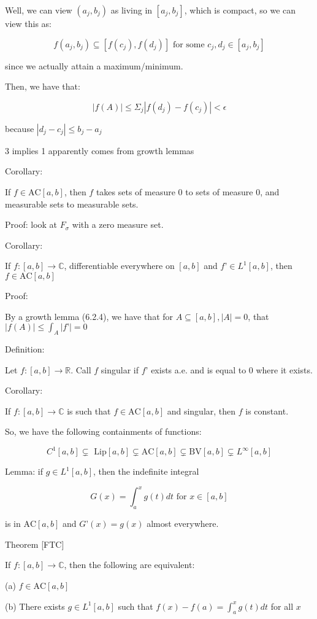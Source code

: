 \documentclass[10pt]{article}
\newcommand{\bv}{{\text{BV}}}
\newcommand{\ac}{\text{AC}}
\begin{document}
Well, we can view $(a_j,b_j)$ as living in $[a_j,b_j]$, which is compact, so we can view this as:

$$ f(a_j,b_j) \subseteq [f(c_j), f(d_j)] \text{ for some } c_j,d_j \in [a_j,b_j]$$

since we actually attain a maximum/minimum.

Then, we have that:

$$|f(A)| \leq \Sigma_j | f(d_j) - f(c_j) | < \epsilon $$

because $| d_j - c_j | \leq b_j - a_j$

3 implies 1 apparently comes from growth lemmas

Corollary:

If $f \in \ac[a,b]$, then $f$ takes sets of measure 0 to sets of measure 0, and measurable sets to measurable sets.

Proof: look at $F_\sigma$ with a zero measure set.

Corollary:

If $f: [a,b] \to \mathbb{C}$, differentiable everywhere on $[a,b]$ and $f’ \in L^1[a,b]$, then $f \in \ac[a,b]$

Proof: 

By a growth lemma (6.2.4), we have that for $A \subseteq [a,b], |A| = 0$, that $|f(A)| \leq \int_A |f’| = 0$

Definition:

Let $f: [a,b] \to \mathbb{R}$. Call $f$ singular if $f’$ exists a.e. and is equal to 0 where it exists.

Corollary:

If $f: [a,b] \to \mathbb{C}$ is such that $f \in \ac[a,b]$ and singular, then $f$ is constant.

So, we have the following containments of functions:

$$ C^1[a,b] \subsetneq \text{ Lip}[a,b]  \subsetneq \ac[a,b] \subsetneq \bv[a,b] \subsetneq L^\infty[a,b]$$

Lemma: if $g \in L^1[a,b]$, then the indefinite integral

$$G(x) = \int_a^x g(t)dt \text{ for } x \in [a,b]$$

is in $\ac[a,b]$ and $G’(x) = g(x)$ almost everywhere.

Theorem [FTC]

If $f: [a,b] \to \mathbb{C}$, then the following are equivalent:

(a) $f \in \ac[a,b]$

(b) There exists $g \in L^1[a,b]$ such that $f(x) - f(a) = \int_a^x g(t) dt$ for all $x$
\end{document}
